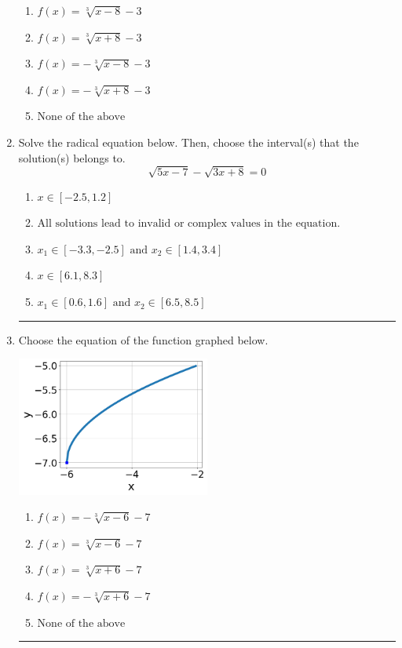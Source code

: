 \documentclass[14pt]{extbook}
\newcommand{\litem}[1]{\item#1\hspace*{-1cm}\rule{\textwidth}{0.4pt}}
\begin{document}
\begin{enumerate}
{\begin{center}
\end{center}
\begin{enumerate}[label=\Alph*.]
\item \( f(x) = \sqrt[3]{x - 8} - 3 \)
\item \( f(x) = \sqrt[3]{x + 8} - 3 \)
\item \( f(x) = - \sqrt[3]{x - 8} - 3 \)
\item \( f(x) = - \sqrt[3]{x + 8} - 3 \)
\item \( \text{None of the above} \)

\end{enumerate} }
\litem{
Solve the radical equation below. Then, choose the interval(s) that the solution(s) belongs to.\[ \sqrt{5 x - 7} - \sqrt{3 x + 8} = 0 \]\begin{enumerate}[label=\Alph*.]
\item \( x \in [-2.5,1.2] \)
\item \( \text{All solutions lead to invalid or complex values in the equation.} \)
\item \( x_1 \in [-3.3, -2.5] \text{ and } x_2 \in [1.4,3.4] \)
\item \( x \in [6.1,8.3] \)
\item \( x_1 \in [0.6, 1.6] \text{ and } x_2 \in [6.5,8.5] \)

\end{enumerate} }
\litem{
Choose the equation of the function graphed below.
\begin{center}
    \includegraphics[width=0.5\textwidth]{../Figures/radicalGraphToEquationCopyA.png}
\end{center}
\begin{enumerate}[label=\Alph*.]
\item \( f(x) = - \sqrt[3]{x - 6} - 7 \)
\item \( f(x) = \sqrt[3]{x - 6} - 7 \)
\item \( f(x) = \sqrt[3]{x + 6} - 7 \)
\item \( f(x) = - \sqrt[3]{x + 6} - 7 \)
\item \( \text{None of the above} \)


\end{enumerate}}
\end{enumerate}
\end{document}
